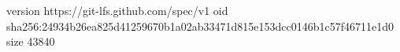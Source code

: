 version https://git-lfs.github.com/spec/v1
oid sha256:24934b26ea825d41259670b1a02ab33471d815e153dcc0146b1c57f46711e1d0
size 43840
